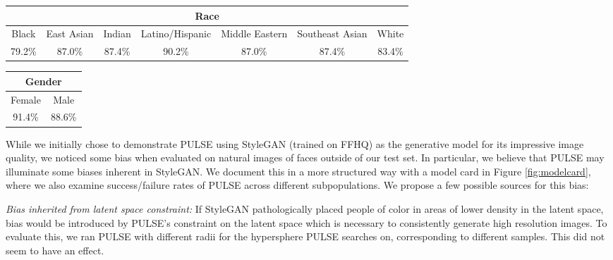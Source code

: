 \documentclass[10pt,twocolumn,letterpaper]{article}
\begin{document}
\begin{table*}[ht]
\centering
\begin{tabular}{|c|c|c|c|c|c|c|}
    \hline
    \multicolumn{7}{|c|}{Race}                                                                 \\ \hline
    Black  & East Asian & Indian & Latino/Hispanic & Middle Eastern & Southeast Asian & White  \\ \hline
    79.2\% & 87.0\%     & 87.4\% & 90.2\%          & 87.0\%         & 87.4\%          & 83.4\% \\ \hline
\end{tabular}
\begin{tabular}{|c|c|}
    \hline
    \multicolumn{2}{|c|}{Gender} \\ \hline
    Female        & Male         \\ \hline
    91.4\%        & 88.6\%       \\ \hline
\end{tabular}
\label{tab:bias}\newline
\caption{Success rates (frequency with which PULSE finds an image in the outputs of the generator that downscales correctly) of PULSE with StyleGAN-FFHQ across various groups, evaluated on FairFace. See ``Failure to converge'' in Section \ref{bias} for full explanation of this analysis and its limitations.}
\end{table*}

While we initially chose to demonstrate PULSE using StyleGAN (trained on FFHQ) as the generative model for its impressive image quality, we noticed some bias when evaluated on natural images of faces outside of our test set. In particular, we believe that PULSE may illuminate some biases inherent in StyleGAN. We document this in a more structured way with a model card in Figure \ref{fig:modelcard}, where we also examine success/failure rates of PULSE across different subpopulations. We propose a few possible sources for this bias:
\newline

\noindent\textit{Bias inherited from latent space constraint:} If StyleGAN pathologically placed people of color in areas of lower density in the latent space, bias would be introduced by PULSE's constraint on the latent space which is necessary to consistently generate high resolution images. To evaluate this, we ran PULSE with different radii for the hypersphere PULSE searches on, corresponding to different samples. This did not seem to have an effect. 
\newline
\end{document}
